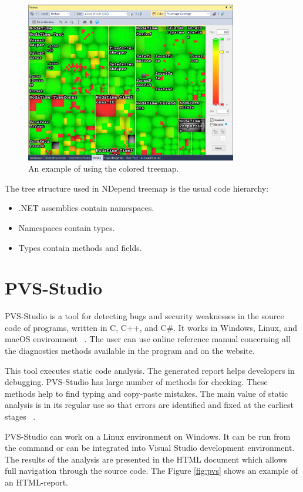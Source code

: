\begin{figure}[h]
	\centering
	\includegraphics[height=70mm]{figures/tree.png}
	\caption{An example of using the colored treemap.}
	\label{fig:tree}
\end{figure}

The tree structure used in NDepend treemap is the usual code hierarchy: 

\begin{itemize}
	\item .NET assemblies contain namespaces.
	\item Namespaces contain types.
	\item Types contain methods and fields.
\end{itemize}

\section{PVS-Studio}

PVS-Studio is a tool for detecting bugs and security weaknesses in the source code of programs, written in C, C++, and C\#. It works in Windows, Linux, and macOS environment ~\cite{pvs}. The user can use online reference manual concerning all the diagnostics methods available in the program and  on the website.

This tool executes static code analysis. The generated report helps developers in debugging. PVS-Studio has large number of methods for checking. These methods help to find typing and copy-paste mistakes. The main value of static analysis is in its regular use so that errors are identified and fixed at the earliest stages ~\cite{pvs}. 				

PVS-Studio can work on a Linux environment on Windows. It can be run from the command or can be integrated into Visual Studio development environment. The results of the analysis are presented in the HTML document which allows full navigation through the source code. The Figure \ref{fig:pvs} shows an example of an HTML-report.

